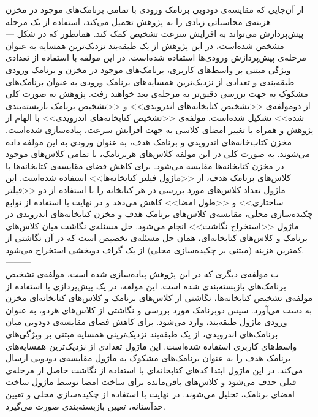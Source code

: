 از آن‌جایی که مقایسه‌ی دودویی برنامک‌ ورودی با تمامی برنامک‌های موجود در مخزن هزینه‌ی محاسباتی زیادی را به پژوهش تحمیل می‌کند،‌ استفاده از یک مرحله پیش‌پردازش می‌تواند به افزایش سرعت تشخیص کمک کند. همانطور که در شکل --- مشخص شده‌است، در این پژوهش از یک طبقه‌بند نزدیک‌ترین همسایه به عنوان مرحله‌ی پیش‌پردازش ورودی‌ها استفاده شده‌است. در این مولفه با استفاده از تعدادی ویژگی‌ مبتنی بر واسط‌های کاربری، برنامک‌های موجود در مخزن و برنامک ورودی طبقه‌بندی و تعدادی از نزدیک‌ترین همسایه‌های برنامک ورودی به عنوان برنامک‌های مشکوک به جهت بررسی دقیق‌تر به مرجله‌ی بعد خواهند رفت. پژوهش به صورت کلی از دومولفه‌ی <<تشخیص کتابخانه‌های اندرویدی>> و <<تشخیص برنامک بازبسته‌بندی‌ شده>> تشکیل شده‌است. مولفه‌ی <<تشخیص کتابخانه‌های اندرویدی>> با الهام از پژوهش  و همراه با تغییر امضا‌ی کلاسی به جهت افزایش سرعت، پیاده‌سازی شده‌است. مخزن‌ کتاب‌خانه‌های اندرویدی و برنامک هدف، به عنوان ورودی به این مولفه‌ داده می‌شوند. به صورت کلی در این مولفه کلاس‌های هربرنامک،‌ با تمامی کلاس‌های موجود در مخزن کتابخانه‌ها مقایسه‌ می‌شود. برای کاهش فضای مقایسه‌ی کتابخانه‌ها با کلاس‌های برنامک هدف، از <<ماژول فیلتر کتابخانه‌ها>> استفاده شده‌است. این ماژول تعداد کلاس‌های مورد بررسی در هر کتابخانه‌ را با استفاده از دو <<فیلتر ساختاری>> و <<طول امضا>> کاهش می‌دهد و در نهایت با استفاده از توابع چکیده‌سازی محلی، مقایسه‌ی کلاس‌های برنامک هدف و مخزن کتابخانه‌های اندرویدی در ماژول <<استخراج نگاشت>>‌ انجام می‌شود. حل مسئله‌ی نگاشت میان کلاس‌های برنامک و کلاس‌های کتابخانه‌ای، همان حل مسئله‌ی تخصیص است که در آن نگاشتی از کمترین هزینه (مبتنی بر چکیده‌سازی محلی) از یک گراف دوبخشی استخراج می‌شود.\\---------\\ ب
مولفه‌ی دیگری که در این پژوهش پیاده‌سازی شده است، مولفه‌ی تشخیص برنامک‌های بازبسته‌بندی شده است. این مولفه‌، در یک پیش‌پردازی با استفاده از مولفه‌ی تشخیص کتابخانه‌ها، نگاشتی از کلاس‌های برنامک و کلاس‌های کتابخانه‌ای مخزن به دست می‌آورد. سپس دوبرنامک مورد بررسی و نگاشتی از کلاس‌‌های هردو، به عنوان ورودی ماژول طبقه‌بند، وارد می‌شود. برای کاهش فضای مقایسه‌ی دودویی میان برنامک‌های اندرویدی، از یک طبقه‌بند نزدیک‌ترینی همسایه مبتنی بر ویژگی‌های واسط‌های کاربری استفاده شده‌است. این ماژول تعدادی از نزدیک‌ترین همسایه‌های برنامک هدف را به عنوان برنامک‌های مشکوک به ماژول مقایسه‌ی دودویی ارسال می‌کند. در این ماژول ابتدا کد‌های کتابخانه‌ای با استفاده از نگاشت حاصل از مرحله‌ی قبلی حذف می‌شود و کلاس‌های باقی‌مانده برای ساخت امضا توسط ماژول ساخت امضا‌ی برنامک، تحلیل می‌شوند. در نهایت با استفاده از چکیده‌سازی محلی و تعیین حدآستانه، تعیین بازبسته‌بندی صورت می‌گیرد.

